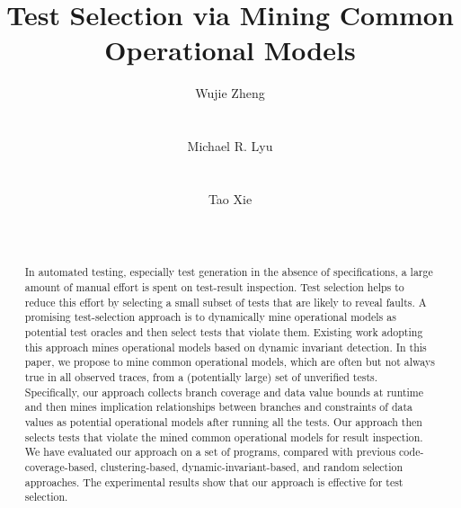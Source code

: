\documentclass{sig-alternate}
\begin{document}
%

\title{ Test Selection via Mining Common Operational Models }

\author{
\alignauthor
Wujie Zheng\\
       \\
       \\
\alignauthor Michael R. Lyu\\
       \\
       \\
\alignauthor Tao Xie\\
       \\
       \\
}
\maketitle

\begin{abstract}
In automated testing, especially test generation in the absence of
specifications, a large amount of manual effort is spent on
test-result inspection. Test selection helps to reduce this effort
by selecting a small subset of tests that are likely to reveal
faults. A promising test-selection approach is to dynamically mine
operational models as potential test oracles and then select tests
that violate them. Existing work adopting this approach mines
operational models based on dynamic invariant detection. In this
paper, we propose to mine common operational models, which are often
but not always true in all observed traces, from a (potentially
large) set of unverified tests. Specifically, our approach collects
branch coverage and data value bounds at runtime and then mines
implication relationships between branches and constraints of data
values as potential operational models after running all the tests.
Our approach then selects tests that violate the mined common
operational models for result inspection. We have evaluated our
approach on a set of programs, compared with previous
code-coverage-based, clustering-based, dynamic-invariant-based, and
random selection approaches. The experimental results show that our
approach is effective for test selection.


\end{abstract}
\end{document}

